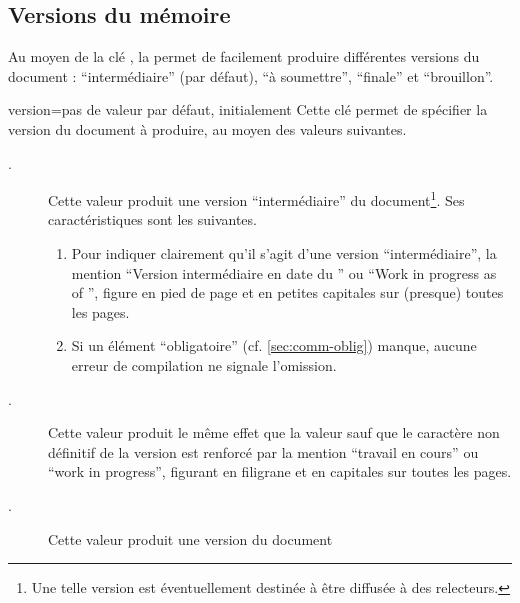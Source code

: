 \subsection{Versions du mémoire}\label{sec:versions}

Au moyen de la clé , la \yatcl{} permet de facilement produire
différentes versions du document : \enquote{intermédiaire} (par défaut),
\enquote{à soumettre}, \enquote{finale} et \enquote{brouillon}.

{
\begin{docKey}{version}{=\textbar{}\textbar{}\textbar{}\textbar{}\textbar{}}{pas
      de valeur par défaut, initialement }
    Cette clé permet de spécifier la version du document à produire, au moyen
    des valeurs suivantes.
    \begin{description}
    \item[.] Cette valeur produit une version
      \enquote{intermédiaire} du document\footnote{Une telle version est
        éventuellement destinée à être diffusée à des relecteurs.}. Ses
      caractéristiques sont les suivantes.
      \begin{enumerate}
      \item\label{item:inprogress:1} Pour indiquer clairement qu'il s'agit
        d'une version \enquote{intermédiaire}, la mention \enquote{Version
          intermédiaire en date du } ou \foreignquote{english}{Work
          in progress as of }\selonlangue{}, figure en pied de page
        et en petites capitales sur (presque) toutes les pages.
      \item\label{item:inprogress:2} Si un élément \enquote{obligatoire}
        (cf. \vref{sec:comm-oblig}) manque, aucune erreur de compilation ne
        signale l'omission.
      \end{enumerate}
    \item[.] Cette valeur produit le même effet que la
      valeur  sauf que le caractère non définitif de la
      version est renforcé par la mention \enquote{travail en cours} ou
      \foreignquote{english}{work in progress}\selonlangue{}, figurant en
      filigrane et en capitales sur toutes les pages.
    \item[.] Cette valeur produit une version du document

\end{description}
\end{docKey}}
